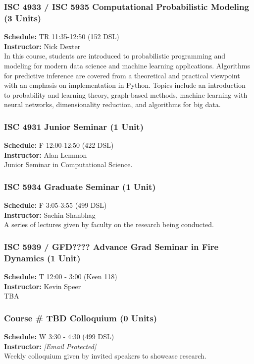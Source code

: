 \documentclass[12pt,a4paper]{article}
\begin{document}
\subsubsection*{ISC 4933 / ISC 5935 Computational Probabilistic Modeling (3 Units)}
\textbf{Schedule:} TR 11:35-12:50 (152 DSL) \\
\textbf{Instructor:} Nick Dexter \\
In this course, students are introduced to probabilistic programming and modeling for modern data science and machine learning applications. Algorithms for predictive inference are covered from a theoretical and practical viewpoint with an emphasis on implementation in Python. Topics include an introduction to probability and learning theory, graph-based methods, machine learning with neural networks, dimensionality reduction, and algorithms for big data.

\subsubsection*{ISC 4931 Junior Seminar (1 Unit)}
\textbf{Schedule:} F 12:00-12:50 (422 DSL) \\
\textbf{Instructor:} Alan Lemmon \\
Junior Seminar in Computational Science.

\subsubsection*{ISC 5934 Graduate Seminar (1 Unit)}
\textbf{Schedule:} F 3:05-3:55 (499 DSL) \\
\textbf{Instructor:} Sachin Shanbhag \\
A series of lectures given by faculty on the research being conducted.

\subsubsection*{ISC 5939 / GFD???? Advance Grad Seminar in Fire Dynamics (1 Unit)}
\textbf{Schedule:} T 12:00 - 3:00 (Keen 118) \\
\textbf{Instructor:} Kevin Speer \\
TBA

\subsubsection*{Course \# TBD Colloquium (0 Units)}
\textbf{Schedule:} W 3:30 - 4:30 (499 DSL) \\
\textbf{Instructor:} \textit{[Email Protected]} \\
Weekly colloquium given by invited speakers to showcase research.
\end{document}
